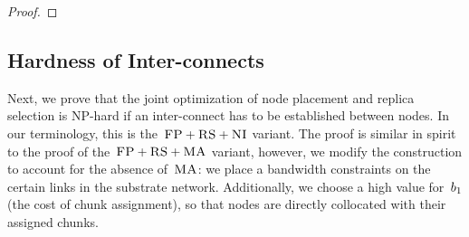 \begin{proof}


%  
\end{proof}



\subsection{Hardness of Inter-connects}\label{ssec:fprscc}



Next, we prove that the joint optimization of node placement and replica selection
is NP-hard if an inter-connect has to be established between nodes.
In our terminology, this is the~$\textsc{FP}+\textsc{RS}+\textsc{NI}$ variant.
The proof is similar in spirit to the proof of the~$\textsc{FP}+\textsc{RS}+\textsc{MA}$ variant, however,
we modify the construction to account for the absence of~$\textsc{MA}$:
we place a bandwidth constraints on the certain links in the substrate network.
Additionally, we choose
a high value for~$b_1$ (the cost of chunk assignment), so that nodes are directly collocated with
their assigned chunks.


